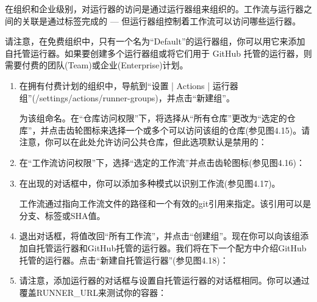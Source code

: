 在组织和企业级别，对运行器的访问是通过运行器组来组织的。工作流与运行器之间的关联是通过标签完成的  ---  但运行器组控制着工作流可以访问哪些运行器。


请注意，在免费组织中，只有一个名为“Default”的运行器组，你可以用它来添加自托管运行器。如果要创建多个运行器组或将它们用于 GitHub 托管的运行器，则需要付费的团队(Team)或企业(Enterprise)计划。


\begin{enumerate}
\item 
在拥有付费计划的组织中，导航到“设置 | Actions | 运行器组”(/settings/actions/runner-groups)，并点击“新建组”。

为该组命名。在“仓库访问权限”下，将选择从“所有仓库”更改为“选定的仓库”，并点击齿轮图标来选择一个或多个可以访问该组的仓库(参见图4.15)。请注意，你可以在此处允许访问公共仓库，但此选项默认是禁用的：


\item 
在“工作流访问权限”下，选择“选定的工作流”并点击齿轮图标(参见图4.16)：


\item 
在出现的对话框中，你可以添加多种模式以识别工作流(参见图4.17)。


工作流通过指向工作流文件的路径和一个有效的git引用来指定。该引用可以是分支、标签或SHA值。

\item 
退出对话框，将值改回“所有工作流”，并点击“创建组”。现在你可以向该组添加自托管运行器和GitHub托管的运行器。我们将在下一个配方中介绍GitHub托管的运行器。点击“新建自托管运行器”(参见图4.18)：


\item 
请注意，添加运行器的对话框与设置自托管运行器的对话框相同。你可以通过覆盖RUNNER\_URL来测试你的容器：



\end{enumerate}
